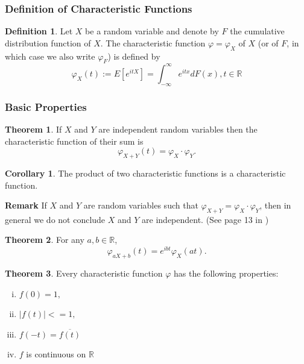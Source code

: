 \documentclass{article}
\theoremstyle{definition}
\newtheorem{definition}{Definition}[section]
\newtheorem{theorem}{Theorem}[section]
\newtheorem{corollary}{Corollary}[theorem]
\newcommand{\reals}{\mathbb{R}}
\begin{document}
\subsubsection{Definition of Characteristic Functions}
\begin{definition}
	Let $X$ be a random variable and denote by $F$ the cumulative distribution function of $X$. The characteristic function $\varphi=\varphi_X$ of $X$ (or of $F$, in which case we also write $\varphi_F$) is defined by \textnormal{\cite{cfms}}
	$$\varphi_X(t):=E[e^{itX}]=\int_{-\infty}^\infty e^{itx}dF(x), t\in\reals$$
\end{definition}
\subsubsection{Basic Properties \cite{cfms}}
\begin{theorem}
If $X$ and $Y$ are independent random variables then the characteristic function of their sum is $$\varphi_{X+Y}(t) = \varphi_{X}\cdot\varphi_{Y}.$$
\end{theorem}
\begin{corollary}
The product of two characteristic functions is a characteristic function.
\end{corollary}
\textbf{Remark} If $X$ and $Y$ are random variables such that $\varphi_{X+Y} = \varphi_X\cdot\varphi_Y $, then in general we do not conclude $X$ and $Y$ are independent. (See page 13 in \cite{cfms})
\begin{theorem}
For any $a,b \in \reals$, $$\varphi_{aX+b}(t)=e^{ibt}\varphi_X(at).$$
\end{theorem}
\begin{theorem}
Every characteristic function $\varphi$ has the following properties:
\begin{enumerate}[(i)]
	\item $f(0)=1,$
	\item $|f(t)|<=1,$
	\item $f(-t)=\overline{f(t)}$
	\item $f$ is continuous on $\reals$
\end{enumerate}
\end{theorem}
\end{document}
